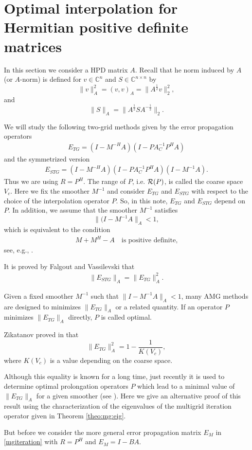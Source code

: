 \documentclass[final]{siamltex}
\newcommand{\uha}{^{\frac{1}{2}}}
\newcommand{\umha}{^{-\frac{1}{2}}}
\newcommand{\beq}{\begin{eqnarray}}
\newcommand{\eeq}{\end{eqnarray}}
\numberwithin{equation}{section}
\newcommand{\ran} {{\cal R}}
\newcommand{\bCn}{\mathbb{C}^n}
\newcommand{\Cnn}{\mathbb{C}^{n \times n}}
\begin{document}
\section{Optimal interpolation  for Hermitian positive definite matrices}

In this section  we  consider a HPD matrix $A$. Recall that he norm induced by
$A$ (or $A$-norm) is defined for $v \in \bCn$ and $S
\in \Cnn$ by
\[
\| v \|_A^2 = (v,v)_A = \|A\uha v\|_2^2,
\]
and 
\[
\| S \|_A = \|A\uha S A\umha\|_2.
\]

We will study the  following two-grid  methods given by the error
propagation
operators
\beq \label{mge}
E_{TG} = (I-M^{-H}A)(I -  PA_C^{-1}P^HA)
\eeq
 and the symmetrized version
\beq \label{smge}
E_{STG} = (I-M^{-H}A)(I -  PA_C^{-1}P^HA)(I-M^{-1}A).
\eeq
Thus we are using $R = P^H$. The range of $P$,
i.e.
$\ran
(P)$,
is
called
the
coarse space $V_c$.
Here   we fix  the smoother $M^{-1}$ and consider $E_{TG}$ and $E_{STG}$ with
respect  to the choice of the interpolation operator $P$. So, in this note,
$E_{TG}$ and $E_{STG}$ depend on $P$. In addition, we assume that the smoother
$M^{-1}$
satisfies 
\[
 \|(I-M^{-1}A \|_A < 1,
\]
which is equivalent to the condition
\beq \label{eq:pos}
M +  M^{H} - A  \quad \mbox{is  positive definite,} 
\eeq
see, e.g., \cite{Vas08}. 

It is proved by  Falgout and Vassilevski \cite{FalV04} that
\beq \label{normeq}
\|E_{STG}\|_A = \|E_{TG}\|_A^2.
\eeq

Given a fixed  smoother $M^{-1}$ such that $\| I-M^{-1}A\|_A < 1$, many AMG
methods are designed to minimizes $ \|E_{TG}\|_A$ or a related quantity. If an
operator  $P$ minimizes    $ \|E_{TG}\|_A$  directly, $P$ is called optimal.

Zikatanov proved in \cite{Zik08} that
\[
 \|E_{TG}\|_A^2 = 1 - \frac{1}{K(V_c)},
\]
where  $ K(V_c)$ is  a  value  depending  on the  coarse  space.

Although  this 
equality is known for a long time, just  recently it is used to determine
optimal prolongation operators $P$  which lead   to a minimal  value of
$\|E_{TG}\|_A$ for a given smoother (see \cite{XuZ17, Bra18}).  Here  we give
an  alternative proof of this result using the characterization of the
eigenvalues of the multigrid iteration operator  given in Theorem
\ref{theo:mg:eig}.

But before  we consider  the  more general error propagation matrix $E_M$ in
\eqref{mgiteration} with $R= P^H$  and  $E_{M} = I - BA$.
\end{document}
